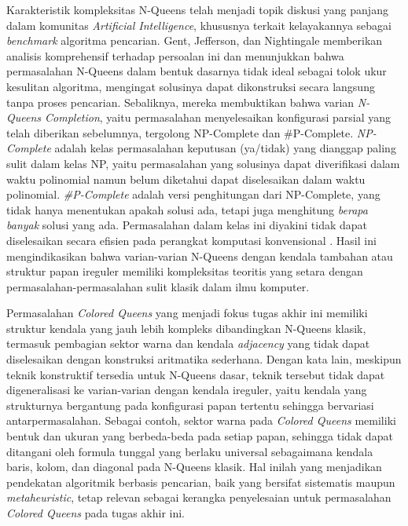 Karakteristik kompleksitas N-Queens telah menjadi topik diskusi yang panjang dalam komunitas \textit{Artificial Intelligence}, khususnya terkait kelayakannya sebagai \textit{benchmark} algoritma pencarian. Gent, Jefferson, dan Nightingale \cite{gent2017complexity} memberikan analisis komprehensif terhadap persoalan ini dan menunjukkan bahwa permasalahan N-Queens dalam bentuk dasarnya tidak ideal sebagai tolok ukur kesulitan algoritma, mengingat solusinya dapat dikonstruksi secara langsung tanpa proses pencarian. Sebaliknya, mereka membuktikan bahwa varian \textit{N-Queens Completion}, yaitu permasalahan menyelesaikan konfigurasi parsial yang telah diberikan sebelumnya, tergolong NP-Complete dan \#P-Complete. \textit{NP-Complete} adalah kelas permasalahan keputusan (ya/tidak) yang dianggap paling sulit dalam kelas NP, yaitu permasalahan yang solusinya dapat diverifikasi dalam waktu polinomial namun belum diketahui dapat diselesaikan dalam waktu polinomial. \textit{\#P-Complete} adalah versi penghitungan dari NP-Complete, yang tidak hanya menentukan apakah solusi ada, tetapi juga menghitung \textit{berapa banyak} solusi yang ada. Permasalahan dalam kelas ini diyakini tidak dapat diselesaikan secara efisien pada perangkat komputasi konvensional \cite{arora2009computational}. Hasil ini mengindikasikan bahwa varian-varian N-Queens dengan kendala tambahan atau struktur papan ireguler memiliki kompleksitas teoritis yang setara dengan permasalahan-permasalahan sulit klasik dalam ilmu komputer.

Permasalahan \textit{Colored Queens} yang menjadi fokus tugas akhir ini memiliki struktur kendala yang jauh lebih kompleks dibandingkan N-Queens klasik, termasuk pembagian sektor warna dan kendala \textit{adjacency} yang tidak dapat diselesaikan dengan konstruksi aritmatika sederhana. Dengan kata lain, meskipun teknik konstruktif tersedia untuk N-Queens dasar, teknik tersebut tidak dapat digeneralisasi ke varian-varian dengan kendala ireguler, yaitu kendala yang strukturnya bergantung pada konfigurasi papan tertentu sehingga bervariasi antarpermasalahan. Sebagai contoh, sektor warna pada \textit{Colored Queens} memiliki bentuk dan ukuran yang berbeda-beda pada setiap papan, sehingga tidak dapat ditangani oleh formula tunggal yang berlaku universal sebagaimana kendala baris, kolom, dan diagonal pada N-Queens klasik. Hal inilah yang menjadikan pendekatan algoritmik berbasis pencarian, baik yang bersifat sistematis maupun \textit{metaheuristic}, tetap relevan sebagai kerangka penyelesaian untuk permasalahan \textit{Colored Queens} pada tugas akhir ini.

